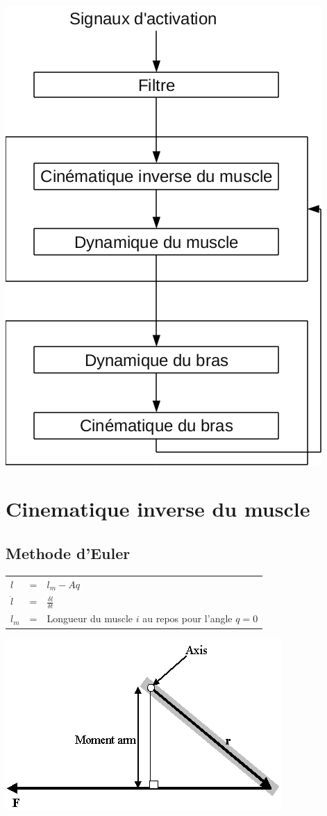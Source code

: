\documentclass[pdftex,a4paper,11pt]{article}
\begin{document}
\paragraph{}
\begin{center}
        \includegraphics[width=.60\linewidth]{fig/modules}
\end{center}


\section{Cinematique inverse du muscle}

\subsection{Methode d'Euler}

\begin{tabular}{lcl}
    $l$       & = & $l_m - A q $ \\
    $\dot{l}$ & = & $\frac{\delta l}{\delta t}$ \\
    $l_{m}$   & = & Longueur du muscle $i$ au repos pour l'angle $q = 0$ \\
\end{tabular}
    
\begin{center}
        \includegraphics[width=.50\linewidth]{fig/moment_arm}
\end{center}
\end{document}
